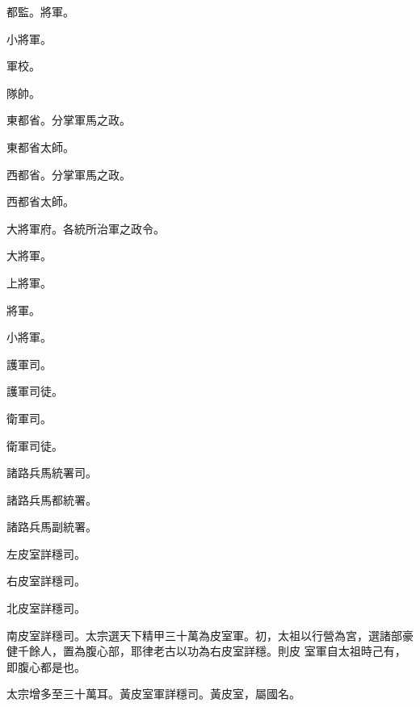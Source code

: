 \begin{pinyinscope}
 都監。將軍。



 小將軍。



 軍校。



 隊帥。



 東都省。分掌軍馬之政。



 東都省太師。



 西都省。分掌軍馬之政。



 西都省太師。



 大將軍府。各統所治軍之政令。



 大將軍。



 上將軍。



 將軍。



 小將軍。



 護軍司。



 護軍司徒。



 衛軍司。



 衛軍司徒。



 諸路兵馬統署司。



 諸路兵馬都統署。



 諸路兵馬副統署。



 左皮室詳穩司。



 右皮室詳穩司。



 北皮室詳穩司。



 南皮室詳穩司。太宗選天下精甲三十萬為皮室軍。初，太祖以行營為宮，選諸部豪健千餘人，置為腹心部，耶律老古以功為右皮室詳穩。則皮
 室軍自太祖時己有，即腹心都是也。



 太宗增多至三十萬耳。黃皮室軍詳穩司。黃皮室，屬國名。




\end{pinyinscope}
